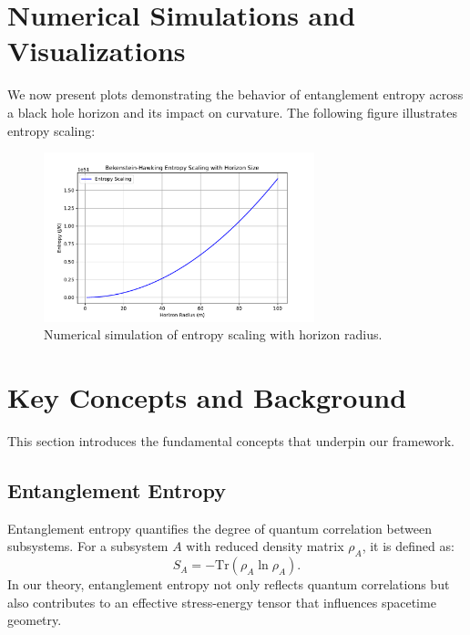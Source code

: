 \documentclass[12pt, a4paper]{article}
\begin{document}
\section{Numerical Simulations and Visualizations}
We now present plots demonstrating the behavior of entanglement entropy across a black hole horizon and its impact on curvature. The following figure illustrates entropy scaling:

\begin{figure}[H]
    \centering
    \includegraphics[width=0.7\textwidth]{entropy_plot.pdf}
    \caption{Numerical simulation of entropy scaling with horizon radius.}
    \label{fig:entropy_scaling}
\end{figure}
\section{Key Concepts and Background}
This section introduces the fundamental concepts that underpin our framework.

\subsection{Entanglement Entropy}
Entanglement entropy quantifies the degree of quantum correlation between subsystems. For a subsystem \(A\) with reduced density matrix \(\rho_A\), it is defined as:
\begin{equation}
    S_A = -\text{Tr}(\rho_A \ln \rho_A).
\end{equation}
In our theory, entanglement entropy not only reflects quantum correlations but also contributes to an effective stress-energy tensor that influences spacetime geometry.
\end{document}
